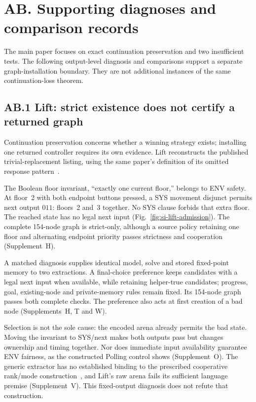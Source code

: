 \section*{AB. Supporting diagnoses and comparison records}
The main paper focuses on exact continuation preservation and two
insufficient tests. The following output-level diagnosis and comparisons
support a separate graph-installation boundary. They are not additional
instances of the same continuation-loss theorem.

\subsection*{AB.1 Lift: strict existence does not certify a returned graph}
Continuation preservation concerns whether a winning strategy exists;
installing one returned controller requires its own evidence. Lift
reconstructs the published trivial-replacement listing, using the same
paper's definition of its omitted response pattern~\cite{degradation}.

The Boolean floor invariant, ``exactly one current floor,'' belongs to
ENV safety. At floor~2 with both endpoint buttons pressed, a SYS movement
disjunct permits next output $011$: floors~2 and~3 together. No SYS clause
forbids that extra floor. The reached state has no legal next input
(Fig.~\ref{fig:si-lift-admission}). The complete 154-node graph is strict-only,
although a source policy retaining one floor and alternating endpoint
priority passes strictness and cooperation (Supplement~H).



A matched diagnosis supplies identical model, solve and stored fixed-point
memory to two extractions. A final-choice preference keeps candidates
with a legal next input when available, while retaining helper-true
candidates; progress, goal, existing-node and private-memory rules remain
fixed. Its 154-node graph passes both complete checks. The preference
also acts at first creation of a bad node (Supplements~H, T and W).

Selection is not the sole cause: the encoded arena already permits the
bad state. Moving the invariant to SYS/next makes both outputs pass but
changes ownership and timing together. Nor does immediate input
availability guarantee ENV fairness, as the constructed Polling control
shows (Supplement~O). The generic extractor has no established binding
to the prescribed cooperative rank/mode construction~\cite{friendly},
and Lift's raw arena fails its sufficient language premise
(Supplement~V). This fixed-output diagnosis does not refute that construction.

